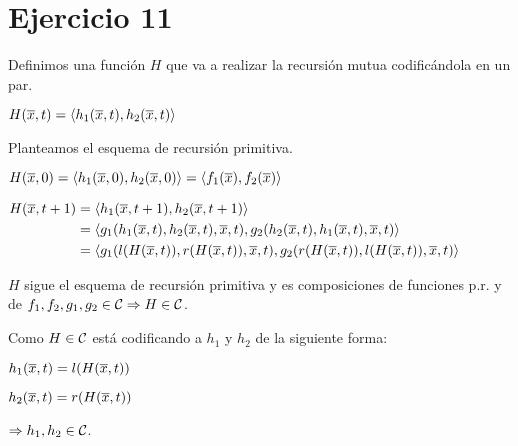 \section*{Ejercicio 11}

Definimos una función $H$ que va a realizar la recursión mutua codificándola en un par.

$H(\overline{x}, t) = \langle h_1(\overline{x}, t), h_2(\overline{x}, t) \rangle$

Planteamos el esquema de recursión primitiva.

$H(\overline{x}, 0) = \langle h_1(\overline{x}, 0), h_2(\overline{x}, 0) \rangle = \langle f_1(\overline{x}), f_2(\overline{x}) \rangle$

$\begin{aligned}
H(\overline{x}, t + 1)
&= \langle h_1(\overline{x}, t + 1), h_2(\overline{x}, t + 1) \rangle \\
& = \langle g_1(h_1(\overline{x}, t), h_2(\overline{x}, t), \overline{x}, t), g_2(h_2(\overline{x}, t), h_1(\overline{x}, t), \overline{x}, t) \rangle \\
& = \langle g_1(l(H(\overline{x}, t)), r(H(\overline{x}, t)), \overline{x}, t), g_2(r(H(\overline{x}, t)), l(H(\overline{x}, t)), \overline{x}, t) \rangle
\end{aligned}$

$H$ sigue el esquema de recursión primitiva y es composiciones de funciones p.r. y de $f_1, f_2, g_1, g_2 \in \mathcal{C} \Rightarrow H \in \mathcal{C}$.

Como $H \in \mathcal{C}$ está codificando a $h_1$ y $h_2$ de la siguiente forma:

$h_1(\overline{x}, t) = l(H(\overline{x}, t))$

$h_2(\overline{x}, t) = r(H(\overline{x}, t))$

$\Rightarrow h_1, h_2 \in \mathcal{C}$.
